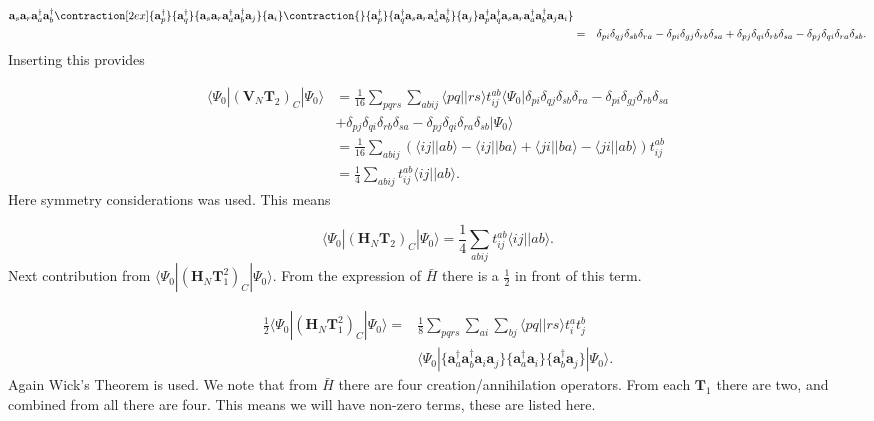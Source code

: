 \documentclass[graybox,sectrefs,envcountresetchap,open=right]{svmonodo}
\begin{document}
\begin{align}
{\mathbf{a}_s}{\mathbf{a}_r}{\mathbf{a}^{\dagger}_a}{\mathbf{a}^{\dagger}_b}
\contraction[2ex]{\mathbf{a}^{\dagger}_p}{\mathbf{a}^{\dagger}_q}{\mathbf{a}_s \mathbf{a}_r
\mathbf{a}^{\dagger}_a \mathbf{a}^{\dagger}_b\mathbf{a}_j}{\mathbf{a}_i}
\contraction{}{\mathbf{a}^{\dagger}_p}{\mathbf{a}^{\dagger}_q 
\mathbf{a}_s \mathbf{a}_r \mathbf{a}^{\dagger}_a \mathbf{a}^{\dagger}_b}{\mathbf{a}_j}
\mathbf{a}^{\dagger}_p \mathbf{a}^{\dagger}_q 
\mathbf{a}_s \mathbf{a}_r
\mathbf{a}^{\dagger}_a \mathbf{a}^{\dagger}_b
\mathbf{a}_j \mathbf{a}_i
\} \nonumber \\
& = & \delta_{pi} \delta_{qj} \delta_{sb} \delta_{ra} 
- \delta_{pi} \delta_{gj} \delta_{rb} \delta_{sa}
+ \delta_{pj} \delta_{qi} \delta_{rb} \delta_{sa}
- \delta_{pj} \delta_{qi} \delta_{ra} \delta_{sb} .
\end{align} 
Inserting this provides

\begin{align}
\langle \Psi_0 | (\mathbf{V}_N \mathbf{T}_2)_C | \Psi_0 \rangle & =  \frac{1}{16} \sum_{pqrs} \sum_{abij}  \langle pq||rs \rangle t_{ij}^{ab} \langle \Psi_0|
\delta_{pi} \delta_{qj} \delta_{sb} \delta_{ra} 
- \delta_{pi} \delta_{gj} \delta_{rb} \delta_{sa}\nonumber \\ & 
+ \delta_{pj} \delta_{qi} \delta_{rb} \delta_{sa}
- \delta_{pj} \delta_{qi} \delta_{ra} \delta_{sb}
| \Psi_0 \rangle \nonumber \\ &
= \frac{1}{16} \sum_{abij} ( 
\langle ij || ab \rangle
- \langle ij || ba \rangle
+ \langle ji || ba \rangle
- \langle ji || ab \rangle ) t_{ij}^{ab} \nonumber \\ &
= \frac{1}{4} \sum_{abij} t_{ij}^{ab} \langle ij||ab \rangle .
\end{align} 
Here symmetry considerations was used. This means 

\begin{equation}
\langle \Psi_0 | (\mathbf{H}_N \mathbf{T}_2)_C | \Psi_0 \rangle = \frac{1}{4} \sum_{abij} t_{ij}^{ab} \langle ij||ab \rangle . \label{Energy_Contribution_2}
\end{equation} 
Next contribution from $\langle \Psi_0 | (\mathbf{H}_N \mathbf{T}_1^2)_C | \Psi_0 \rangle$. From the expression of $\bar{H}$ there is a $\frac{1}{2}$ in front of this term.

\begin{align}
\frac{1}{2} \langle \Psi_0 | (\mathbf{H}_N \mathbf{T}_1^2)_C | \Psi_0 \rangle = & \frac{1}{8} \sum_{pqrs} \sum_{ai} \sum_{bj} \langle pq || rs \rangle t_i^a t_j^b \nonumber \\ & 
\langle \Psi_0| 
 \{\mathbf{a}^{\dagger}_a \mathbf{a}^{\dagger}_b \mathbf{a}_i \mathbf{a}_j \}
\{\mathbf{a}^{\dagger}_a \mathbf{a}_i \}
\{\mathbf{a}^{\dagger}_b \mathbf{a}_j \}
| \Psi_0 \rangle .
\end{align} 
Again Wick's Theorem is used. We note that from $\bar{H}$ there are four creation/annihilation operators. From each $\mathbf{T}_1$ there are two, and combined from all there are four. This means we will have non-zero terms, these are listed here.
\end{document}

